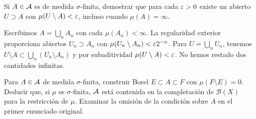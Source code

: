 \begin{ejercicio}\label{ej:v2-l31-4}
Si $A\in\mathcal A$ es de medida $\sigma$-finita, demostrar que para cada $\varepsilon>0$ existe un abierto $U\supset A$ con $\mu(U\setminus A)<\varepsilon$, incluso cuando $\mu(A)=\infty$.
\end{ejercicio}
\begin{solucion}
Escribimos $A=\bigcup_nA_n$ con cada $\mu(A_n)<\infty$. La regularidad exterior proporciona abiertos $U_n\supset A_n$ con $\mu(U_n\setminus A_n)<\varepsilon2^{-n}$. Para $U=\bigcup_nU_n$, tenemos $U\setminus A\subset\bigcup_n(U_n\setminus A_n)$ y por subaditividad $\mu(U\setminus A)<\varepsilon$. No hemos restado dos cantidades infinitas.
\end{solucion}

\begin{ejercicio}\label{ej:v2-l31-5}
Para $A\in\mathcal A$ de medida $\sigma$-finita, construir Borel $E\subset A\subset F$ con $\mu(F\setminus E)=0$. Deducir que, si $\mu$ es $\sigma$-finita, $\mathcal A$ está contenida en la completación de $\mathcal B(X)$ para la restricción de $\mu$. Examinar la omisión de la condición sobre $A$ en el primer enunciado original.
\end{ejercicio}
